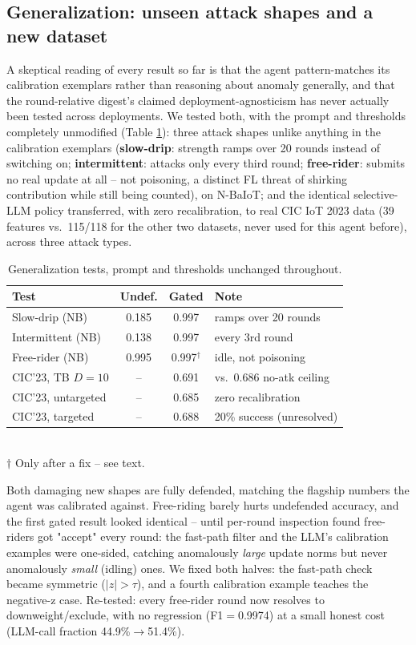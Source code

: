 \documentclass[conference]{IEEEtran}
\begin{document}
\subsection{Generalization: unseen attack shapes and a new dataset}
A skeptical reading of every result so far is that the agent pattern-matches its calibration exemplars rather than reasoning about anomaly generally, and that the round-relative digest's claimed deployment-agnosticism has never actually been tested across deployments. We tested both, with the prompt and thresholds completely unmodified (Table \ref{tab:generalization}): three attack shapes unlike anything in the calibration exemplars (\textbf{slow-drip}: strength ramps over 20 rounds instead of switching on; \textbf{intermittent}: attacks only every third round; \textbf{free-rider}: submits no real update at all -- not poisoning, a distinct FL threat of shirking contribution while still being counted), on N-BaIoT; and the identical selective-LLM policy transferred, with zero recalibration, to real CIC IoT 2023 data (39 features vs.\ 115/118 for the other two datasets, never used for this agent before), across three attack types.

\begin{table}[t]
\centering
\scriptsize
\caption{Generalization tests, prompt and thresholds unchanged throughout.}
\label{tab:generalization}
\begin{tabular}{@{}lccl@{}}
\toprule
\textbf{Test} & \textbf{Undef.} & \textbf{Gated} & \textbf{Note} \\
\midrule
Slow-drip (NB) & 0.185 & 0.997 & ramps over 20 rounds \\
Intermittent (NB) & 0.138 & 0.997 & every 3rd round \\
Free-rider (NB) & 0.995 & 0.997$^\dagger$ & idle, not poisoning \\
CIC'23, TB $D{=}10$ & -- & 0.691 & vs.\ 0.686 no-atk ceiling \\
CIC'23, untargeted & -- & 0.685 & zero recalibration \\
CIC'23, targeted & -- & 0.688 & 20\% success (unresolved) \\
\bottomrule
\end{tabular}
\\[2pt]
{\scriptsize $\dagger$ Only after a fix -- see text.}
\end{table}

Both damaging new shapes are fully defended, matching the flagship numbers the agent was calibrated against. Free-riding barely hurts undefended accuracy, and the first gated result looked identical -- until per-round inspection found free-riders got "accept" every round: the fast-path filter and the LLM's calibration examples were one-sided, catching anomalously \emph{large} update norms but never anomalously \emph{small} (idling) ones. We fixed both halves: the fast-path check became symmetric ($|z|>\tau$), and a fourth calibration example teaches the negative-z case. Re-tested: every free-rider round now resolves to downweight/exclude, with no regression (F1$=$0.9974) at a small honest cost (LLM-call fraction 44.9\%$\to$51.4\%).
\end{document}
